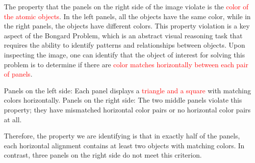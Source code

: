 \begin{tcolorbox}[breakable,enhanced jigsaw,opacityback=0,]
\begin{dialogue}
		The property that the panels on the right side of the image violate is the \textcolor{red}{color of the atomic objects}. In the left panels, all the objects have the same color, while in the right panels, the objects have different colors. This property violation is a key aspect of the Bongard Problem, which is an abstract visual reasoning task that requires the ability to identify patterns and relationships between objects.
		\vspace{1em}
		 Upon inspecting the image, one can identify that the object of interest for solving this problem is to determine if there are \textcolor{red}{color matches horizontally between each pair of panels}.
		
		Panels on the left side: Each panel displays a \textcolor{red}{triangle and a square} with matching colors horizontally.
		Panels on the right side: The two middle panels violate this property; they have mismatched horizontal color pairs or no horizontal color pairs at all.
		
		Therefore, the property we are identifying is that in exactly half of the panels, each horizontal alignment contains at least two objects with matching colors. In contrast, three panels on the right side do not meet this criterion.
	\end{dialogue}
	\label{fig:task18-bongard}
\end{tcolorbox}




